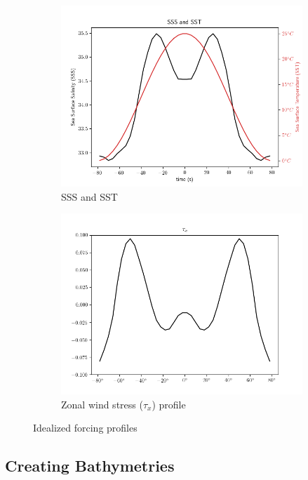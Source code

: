 \documentclass[a4paper]{article}
\begin{document}
\begin{figure}[H]
\begin{subfigure}{.5\textwidth}
	\includegraphics[width=0.9\linewidth]{sss_sst_profile.png}
	\caption{SSS and SST}
	\label{fig:sst_sss}
\end{subfigure}
\begin{subfigure}{.5\textwidth}
	\centering
	\includegraphics[width=0.9\linewidth]{tau_x_profile.png}
	\caption{Zonal wind stress ($\tau_x$) profile}
	\label{fig:tau_X}
\end{subfigure}

\caption{Idealized forcing profiles}

\end{figure}

\begin{multicols}{2}
\subsection{Creating Bathymetries}

\end{multicols}
\end{document}
